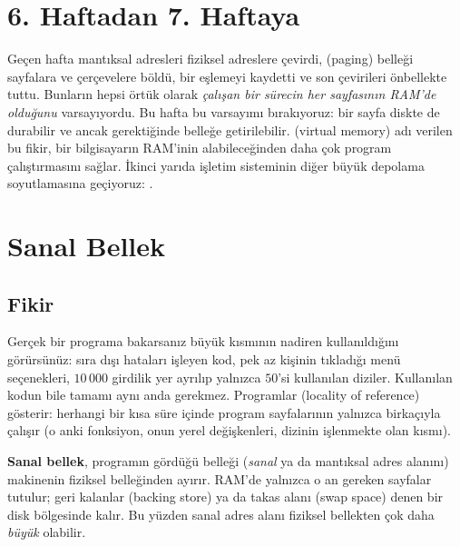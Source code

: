 \setcounter{tocdepth}{1}
\tableofcontents

\section{6. Haftadan 7. Haftaya}

Geçen hafta  mantıksal adresleri fiziksel adreslere çevirdi,  (paging) belleği sayfalara ve çerçevelere böldü, bir  eşlemeyi kaydetti ve  son çevirileri önbellekte tuttu. Bunların hepsi örtük olarak \emph{çalışan bir sürecin her sayfasının RAM'de olduğunu} varsayıyordu. Bu hafta bu varsayımı bırakıyoruz: bir sayfa diskte de durabilir ve ancak gerektiğinde belleğe getirilebilir.  (virtual memory) adı verilen bu fikir, bir bilgisayarın RAM'inin alabileceğinden daha çok program çalıştırmasını sağlar. İkinci yarıda işletim sisteminin diğer büyük depolama soyutlamasına geçiyoruz: .

\section{Sanal Bellek}

\subsection{Fikir}

Gerçek bir programa bakarsanız büyük kısmının nadiren kullanıldığını görürsünüz: sıra dışı hataları işleyen kod, pek az kişinin tıkladığı menü seçenekleri, $10\,000$ girdilik yer ayrılıp yalnızca $50$'si kullanılan diziler. Kullanılan kodun bile tamamı aynı anda gerekmez. Programlar  (locality of reference) gösterir: herhangi bir kısa süre içinde program sayfalarının yalnızca birkaçıyla çalışır (o anki fonksiyon, onun yerel değişkenleri, dizinin işlenmekte olan kısmı).

\begin{keyidea}
\textbf{Sanal bellek}, programın gördüğü belleği (\emph{sanal} ya da mantıksal adres alanını) makinenin fiziksel belleğinden ayırır. RAM'de yalnızca o an gereken sayfalar tutulur; geri kalanlar  (backing store) ya da takas alanı (swap space) denen bir disk bölgesinde kalır. Bu yüzden sanal adres alanı fiziksel bellekten çok daha \emph{büyük} olabilir.
\end{keyidea}

